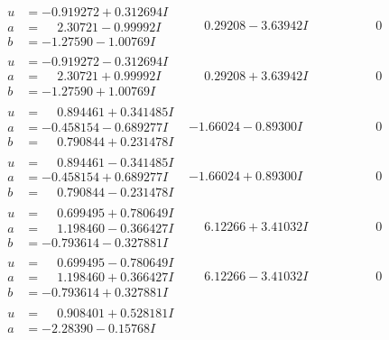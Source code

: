 \documentclass[1p]{elsarticle_modified}
\theoremstyle{definition}
\begin{document}
$$\begin{array}{c|c|c}
 \hline 
\begin{aligned}
u &= -0.919272 + 0.312694 I \\
a &= \phantom{-}2.30721 - 0.99992 I \\
b &= -1.27590 - 1.00769 I\end{aligned}
 & \phantom{-}0.29208 - 3.63942 I & \phantom{-0.000000 } 0 \\ \hline\begin{aligned}
u &= -0.919272 - 0.312694 I \\
a &= \phantom{-}2.30721 + 0.99992 I \\
b &= -1.27590 + 1.00769 I\end{aligned}
 & \phantom{-}0.29208 + 3.63942 I & \phantom{-0.000000 } 0 \\ \hline\begin{aligned}
u &= \phantom{-}0.894461 + 0.341485 I \\
a &= -0.458154 - 0.689277 I \\
b &= \phantom{-}0.790844 + 0.231478 I\end{aligned}
 & -1.66024 - 0.89300 I & \phantom{-0.000000 } 0 \\ \hline\begin{aligned}
u &= \phantom{-}0.894461 - 0.341485 I \\
a &= -0.458154 + 0.689277 I \\
b &= \phantom{-}0.790844 - 0.231478 I\end{aligned}
 & -1.66024 + 0.89300 I & \phantom{-0.000000 } 0 \\ \hline\begin{aligned}
u &= \phantom{-}0.699495 + 0.780649 I \\
a &= \phantom{-}1.198460 - 0.366427 I \\
b &= -0.793614 - 0.327881 I\end{aligned}
 & \phantom{-}6.12266 + 3.41032 I & \phantom{-0.000000 } 0 \\ \hline\begin{aligned}
u &= \phantom{-}0.699495 - 0.780649 I \\
a &= \phantom{-}1.198460 + 0.366427 I \\
b &= -0.793614 + 0.327881 I\end{aligned}
 & \phantom{-}6.12266 - 3.41032 I & \phantom{-0.000000 } 0 \\ \hline\begin{aligned}
u &= \phantom{-}0.908401 + 0.528181 I \\
a &= -2.28390 - 0.15768 I \\

\end{aligned}
\end{array}$$
\end{document}
